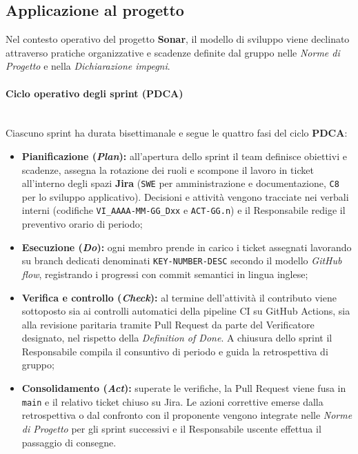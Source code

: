 \subsection{Applicazione al progetto}
Nel contesto operativo del progetto \textbf{Sonar}, il modello di sviluppo viene declinato attraverso pratiche organizzative e scadenze definite dal gruppo nelle \textit{Norme di Progetto} e nella \textit{Dichiarazione impegni}.

\paragraph{Ciclo operativo degli sprint (PDCA)}~\\[0.15cm]
Ciascuno sprint ha durata bisettimanale e segue le quattro fasi del ciclo \textbf{PDCA}:
\begin{itemize}
    \item \textbf{Pianificazione (\textit{Plan}):} all'apertura dello sprint il team definisce obiettivi e scadenze, assegna la rotazione dei ruoli e scompone il lavoro in ticket all'interno degli spazi \textbf{Jira} (\texttt{SWE} per amministrazione e documentazione, \texttt{C8} per lo sviluppo applicativo). Decisioni e attività vengono tracciate nei verbali interni (codifiche \texttt{VI\_AAAA-MM-GG\_Dxx} e \texttt{ACT-GG.n}) e il Responsabile redige il preventivo orario di periodo;
    \item \textbf{Esecuzione (\textit{Do}):} ogni membro prende in carico i ticket assegnati lavorando su branch dedicati denominati \texttt{KEY-NUMBER-DESC} secondo il modello \textit{GitHub flow}, registrando i progressi con commit semantici in lingua inglese;
    \item \textbf{Verifica e controllo (\textit{Check}):} al termine dell'attività il contributo viene sottoposto sia ai controlli automatici della pipeline CI su GitHub Actions, sia alla revisione paritaria tramite Pull Request da parte del Verificatore designato, nel rispetto della \textit{Definition of Done}. A chiusura dello sprint il Responsabile compila il consuntivo di periodo e guida la retrospettiva di gruppo;
    \item \textbf{Consolidamento (\textit{Act}):} superate le verifiche, la Pull Request viene fusa in \texttt{main} e il relativo ticket chiuso su Jira. Le azioni correttive emerse dalla retrospettiva o dal confronto con il proponente vengono integrate nelle \textit{Norme di Progetto} per gli sprint successivi e il Responsabile uscente effettua il passaggio di consegne.
\end{itemize}

